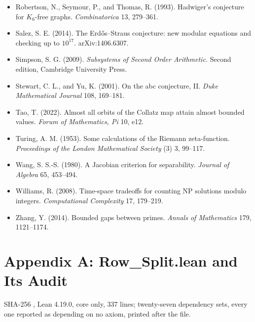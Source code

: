 \documentclass[10pt,twocolumn]{article}
\begin{document}
\begin{itemize}
  \(2996863034895 \cdot 2^{1290000} \pm 1\). primegrid.com, September
  2016.
\item
  Robertson, N., Seymour, P., and Thomas, R. (1993). Hadwiger's
  conjecture for \(K_6\)-free graphs. \emph{Combinatorica} 13, 279--361.
\item
  Salez, S. E. (2014). The Erdős--Straus conjecture: new modular
  equations and checking up to \(10^{17}\). arXiv:1406.6307.
\item
  Simpson, S. G. (2009). \emph{Subsystems of Second Order Arithmetic.}
  Second edition, Cambridge University Press.
\item
  Stewart, C. L., and Yu, K. (2001). On the abc conjecture, II.
  \emph{Duke Mathematical Journal} 108, 169--181.
\item
  Tao, T. (2022). Almost all orbits of the Collatz map attain almost
  bounded values. \emph{Forum of Mathematics, Pi} 10, e12.
\item
  Turing, A. M. (1953). Some calculations of the Riemann zeta-function.
  \emph{Proceedings of the London Mathematical Society} (3) 3, 99--117.
\item
  Wang, S. S.-S. (1980). A Jacobian criterion for separability.
  \emph{Journal of Algebra} 65, 453--494.
\item
  Williams, R. (2008). Time-space tradeoffs for counting NP solutions
  modulo integers. \emph{Computational Complexity} 17, 179--219.
\item
  Zhang, Y. (2014). Bounded gaps between primes. \emph{Annals of
  Mathematics} 179, 1121--1174.
\end{itemize}

\hypertarget{appendix-a-row_split.lean-and-its-audit}{%
\section{Appendix A: Row\_Split.lean and Its
Audit}\label{appendix-a-row_split.lean-and-its-audit}}

SHA-256
\texttt{},
Lean 4.19.0, core only, 337 lines; twenty-seven dependency sets, every
one reported as depending on no axiom, printed after the file.

\begingroup\scriptsize
\end{document}

